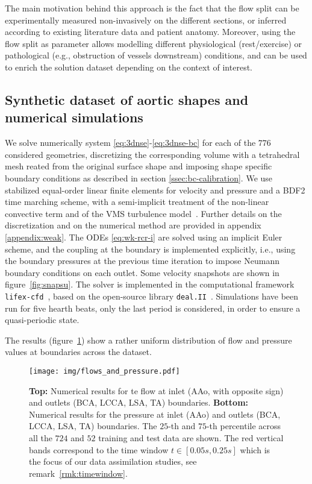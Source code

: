 \begin{rmk}
The main motivation behind this approach is the fact that the flow split can be experimentally measured non-invasively on the different sections, or inferred according 
to existing literature data and patient anatomy. Moreover, using the flow split as parameter allows modelling different physiological (rest/exercise)
or pathological (e.g., obstruction of vessels downstream) conditions, and can be used to enrich the solution dataset depending on the context of interest.
%
\end{rmk}


\subsection{Synthetic dataset of aortic shapes and numerical simulations}
\label{ref:numsim}
We solve numerically system \eqref{eq:3dnse}-\eqref{eq:3dnse-bc} for each of the $776$ considered geometries, discretizing the corresponding volume with a tetrahedral mesh reated from the original surface shape
and imposing shape specific boundary conditions as described in section \eqref{ssec:bc-calibration}. 
%
We use stabilized equal-order linear finite elements for velocity and pressure and a BDF2 time marching scheme, 
with a semi-implicit treatment of the non-linear convective term and of the VMS turbulence model~\cite{bazilevs2007variational, forti2015semi}.
Further details on the discretization and on the numerical method are provided in  appendix \ref{appendix:weak}.
%
The ODEs \eqref{eq:wk-rcr-i} are solved using an implicit Euler scheme, and the coupling at the boundary is implemented explicitly, i.e., using the boundary pressures at the previous time iteration to impose Neumann boundary conditions on each outlet. Some velocity snapshots are shown in figure~\ref{fig:snapsu}.
%
The solver is implemented in the computational framework \texttt{lifex-cfd}~\cite{AFRICA2024109039}, based on the open-source library \texttt{deal.II}~\cite{arndt2022deal}.
%
Simulations have been run for five hearth beats, only the last period is considered, in order to ensure a quasi-periodic state.

The results (figure~\ref{fig:flow_and_pressure}) show a rather uniform distribution of flow and pressure values at boundaries across the dataset.
%
\begin{figure}[!htp]
  \centering
  \texttt{[image: img/flows\_and\_pressure.pdf]}
  \caption{\textbf{Top: } Numerical results for te flow at inlet (AAo, with opposite sign) and outlets (BCA, LCCA, LSA, TA) boundaries. 
  \textbf{Bottom: }  Numerical results for the pressure at inlet (AAo) and outlets (BCA, LCCA, LSA, TA) boundaries. The $25$-th and $75$-th percentile across all the $724$ and $52$ training and test data are shown. The red vertical bands correspond to the time window $t\in[0.05s, 0.25s]$ which is the focus of our data assimilation studies, see remark~\ref{rmk:timewindow}.}
\label{fig:flow_and_pressure}
\end{figure}

